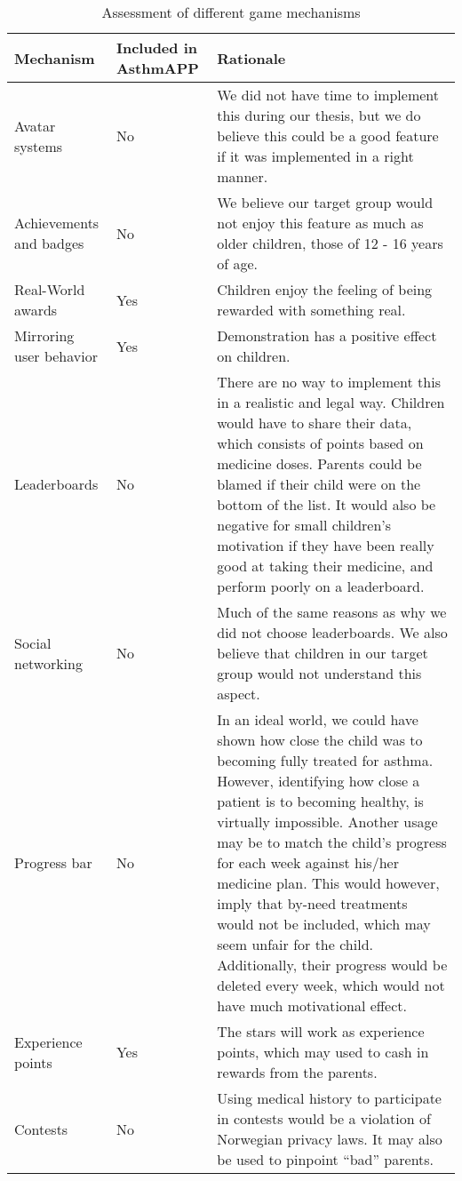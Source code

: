 \begin{onehalfspacing}
\begin{table}[H]
\begin{tabular}{| p{2.5cm} | p{2.1cm} | p{9.5cm} | }
	\hline
	\textbf{Mechanism} & \textbf{Included in AsthmAPP} & \textbf{Rationale} \\
	\hline
	Avatar systems & No & We did not have time to implement this during our thesis, but we do believe this could be a good feature if it was implemented in a right manner.    
	 \\
	\hline
	Achievements and badges & No & We believe our target group would not enjoy this feature as much as older children, those of 12 - 16 years of age.  \\
	\hline 
	Real-World awards & Yes & Children enjoy the feeling of being rewarded with something real.
	 \\
	\hline
	Mirroring user behavior & Yes & Demonstration has a positive effect on children.
	\\
	\hline
	Leaderboards & No & There are no way to implement this in a realistic and legal way. Children would have to share their data, which consists of points based on medicine doses. Parents could be blamed if their child were on the bottom of the list. It would also be negative for small children's motivation if they have been really good at taking their medicine, and perform poorly on a leaderboard. 
	\\
	\hline
	Social networking & No & Much of the same reasons as why we did not choose leaderboards. We also believe that children in our target group would not understand this aspect.  
	\\
	\hline
	Progress bar & No & In an ideal world, we could have shown how close the child was to becoming fully treated for asthma. However, identifying how close a patient is to becoming healthy, is virtually impossible. Another usage may be to match the child's progress for each week against his/her medicine plan. This would however, imply that by-need treatments would not be included, which may seem unfair for the child. Additionally, their progress would be deleted every week, which would not have much motivational effect.  
	\\
	\hline
	Experience points & Yes & The stars will work as experience points, which may used to cash in rewards from the parents. 
	\\
	\hline
	Contests & No & Using medical history to participate in contests would be a violation of Norwegian privacy laws. It may also be used to pinpoint ``bad'' parents.      
	\\
	\hline
\end{tabular}
\caption{Assessment of different game mechanisms}
\label{tab:game-mech-in-astmapp}
\end{table}
\end{onehalfspacing}

